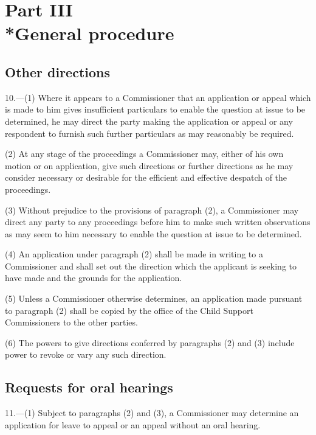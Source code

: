 \documentclass[12pt,a4paper]{article}
\begin{document}
\section[Part III --- General procedure]{Part III\\*General procedure}

\renewcommand\parthead{--- Part III}

\subsection[10. Other directions]{Other directions}

10.—(1) Where it appears to a Commissioner that an application or appeal which is made to him gives insufficient particulars to enable the question at issue to be determined, he may direct the party making the application or appeal or any respondent to furnish such further particulars as may reasonably be required.

(2) At any stage of the proceedings a Commissioner may, either of his own motion or on application, give such directions or further directions as he may consider necessary or desirable for the efficient and effective despatch of the proceedings.

(3) Without prejudice to the provisions of paragraph (2), a Commissioner may direct any party to any proceedings before him to make such written observations as may seem to him necessary to enable the question at issue to be determined.

(4) An application under paragraph (2) shall be made in writing to a Commissioner and shall set out the direction which the applicant is seeking to have made and the grounds for the application.

(5) Unless a Commissioner otherwise determines, an application made pursuant to paragraph (2) shall be copied by the office of the Child Support Commissioners to the other parties.

(6) The powers to give directions conferred by paragraphs (2) and (3) include power to revoke or vary any such direction.

\subsection[11. Requests for oral hearings]{Requests for oral hearings}

11.—(1) Subject to paragraphs (2) and (3), a Commissioner may determine an application for leave to appeal or an appeal without an oral hearing.
\end{document}
